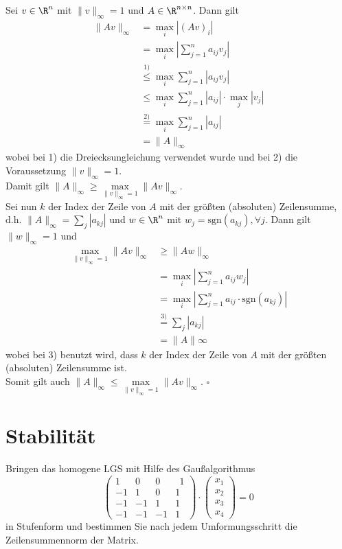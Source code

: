 Sei $v \in \R^n$ mit $\|v\|_\infty =1$ und $A \in \R^{n\times n}$. Dann gilt
\begin{align*}
\|Av\|_\infty&=\max_{i}|(Av)_i|\\
&=\max_{i}|\sum_{j=1}^n a_{ij}v_j| \\
&\stackrel{1)}{\le} \max_{i}\sum_{j=1}^n |a_{ij}v_j| \\
&\le \max_{i} \sum_{j=1}^n |a_{ij}| \cdot \max_j|v_j|\\
&\stackrel{2)}{=}\max_{i} \sum_{j=1}^n |a_{ij}| \\
&=\|A\|_\infty
\end{align*}
wobei bei 1) die Dreiecksungleichung verwendet wurde und bei 2) die Voraussetzung $\|v\|_\infty=1$.\\
Damit gilt $\|A\|_\infty\ge \max \limits_{\|v\|_\infty=1} \|Av\|_\infty$.\\
Sei nun $k$ der Index der Zeile von $A$ mit der größten (absoluten) Zeilensumme, d.h. $\|A\|_\infty=\sum_j |a_{kj}|$ und $w \in \R^n$ mit $w_j=\text{sgn}(a_{kj}), \forall j$. Dann gilt $\|w\|_\infty=1$ und 
\begin{align*}
\max \limits_{\|v\|_\infty=1} \|Av\|_\infty &\ge \|Aw\|_\infty \\
&= \max_{i}|\sum_{j=1}^n a_{ij}w_j|\\
&=\max_{i}|\sum_{j=1}^n a_{ij}\cdot \text{sgn}(a_{kj})|\\
&\stackrel{3)}{=}\sum_j |a_{kj}|\\
&=\|A\|\infty
\end{align*}
wobei bei 3) benutzt wird, dass $k$ der Index der Zeile von $A$ mit der größten (absoluten) Zeilensumme ist.\\
Somit gilt auch $\|A\|_\infty\le \max \limits_{\|v\|_\infty=1} \|Av\|_\infty$. 
\hfill $\square$
\vspace{5mm}
\newpage
\section{Stabilität}
Bringen das homogene LGS mit Hilfe des Gaußalgorithmus
$$
\left(\begin{array}{rrrr} 1 & 0 & 0 & \ \ 1 \\ -1& 1 &0 &1 \\ -1 & -1 & 1 &1 \\ -1 & -1 &-1 &1 \end{array}\right) \cdot \begin{pmatrix}x_1 \\x_2\\x_3\\x_4 \end{pmatrix} = 0
$$
in Stufenform und bestimmen Sie nach jedem Umformungsschritt die Zeilensummennorm der Matrix.

